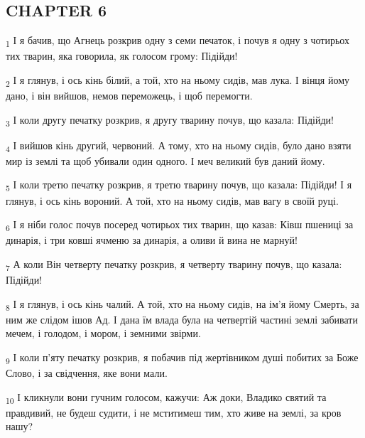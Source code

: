 \subsection{CHAPTER 6}
\begin{tcolorbox}
\textsubscript{1} І я бачив, що Агнець розкрив одну з семи печаток, і почув я одну з чотирьох тих тварин, яка говорила, як голосом грому: Підійди!
\end{tcolorbox}
\begin{tcolorbox}
\textsubscript{2} І я глянув, і ось кінь білий, а той, хто на ньому сидів, мав лука. І вінця йому дано, і він вийшов, немов переможець, і щоб перемогти.
\end{tcolorbox}
\begin{tcolorbox}
\textsubscript{3} І коли другу печатку розкрив, я другу тварину почув, що казала: Підійди!
\end{tcolorbox}
\begin{tcolorbox}
\textsubscript{4} І вийшов кінь другий, червоний. А тому, хто на ньому сидів, було дано взяти мир із землі та щоб убивали один одного. І меч великий був даний йому.
\end{tcolorbox}
\begin{tcolorbox}
\textsubscript{5} І коли третю печатку розкрив, я третю тварину почув, що казала: Підійди! І я глянув, і ось кінь вороний. А той, хто на ньому сидів, мав вагу в своїй руці.
\end{tcolorbox}
\begin{tcolorbox}
\textsubscript{6} І я ніби голос почув посеред чотирьох тих тварин, що казав: Ківш пшениці за динарія, і три ковші ячменю за динарія, а оливи й вина не марнуй!
\end{tcolorbox}
\begin{tcolorbox}
\textsubscript{7} А коли Він четверту печатку розкрив, я четверту тварину почув, що казала: Підійди!
\end{tcolorbox}
\begin{tcolorbox}
\textsubscript{8} І я глянув, і ось кінь чалий. А той, хто на ньому сидів, на ім'я йому Смерть, за ним же слідом ішов Ад. І дана їм влада була на четвертій частині землі забивати мечем, і голодом, і мором, і земними звірми.
\end{tcolorbox}
\begin{tcolorbox}
\textsubscript{9} І коли п'яту печатку розкрив, я побачив під жертівником душі побитих за Боже Слово, і за свідчення, яке вони мали.
\end{tcolorbox}
\begin{tcolorbox}
\textsubscript{10} І кликнули вони гучним голосом, кажучи: Аж доки, Владико святий та правдивий, не будеш судити, і не мститимеш тим, хто живе на землі, за кров нашу?
\end{tcolorbox}

